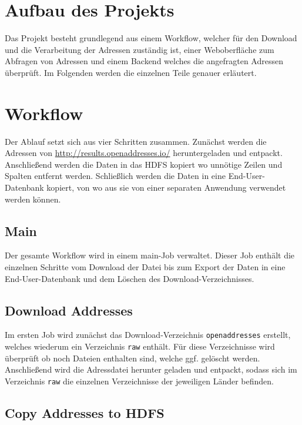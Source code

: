\documentclass[
	a4paper,
	12p,
	bibliography=totocnumbered
]{scrartcl}
\begin{document}
\section{Aufbau des Projekts}

Das Projekt besteht grundlegend aus einem Workflow, welcher für den Download und die Verarbeitung der Adressen zuständig ist, einer Weboberfläche zum Abfragen von Adressen und einem Backend welches die angefragten Adressen überprüft. Im Folgenden werden die einzelnen Teile genauer erläutert.


\section{Workflow}

Der Ablauf setzt sich aus vier Schritten zusammen. Zunächst werden die Adressen von \url{http://results.openaddresses.io/} heruntergeladen und entpackt. Anschließend werden die Daten in das HDFS kopiert wo unnötige Zeilen und Spalten entfernt werden. Schließlich werden die Daten in eine End-User-Datenbank kopiert, von wo aus sie von einer separaten Anwendung verwendet werden können.


\subsection{Main}

Der gesamte Workflow wird in einem main-Job verwaltet. Dieser Job enthält die einzelnen Schritte vom Download der Datei bis zum Export der Daten in eine End-User-Datenbank und dem Löschen des Download-Verzeichnisses. 


\subsection{Download Addresses}

Im ersten Job wird zunächst das Download-Verzeichnis \texttt{openaddresses} erstellt, welches wiederum ein Verzeichnis \texttt{raw} enthält. Für diese Verzeichnisse wird überprüft ob noch Dateien enthalten sind, welche ggf. gelöscht werden. Anschließend wird die Adressdatei herunter geladen und entpackt, sodass sich im Verzeichnis \texttt{raw} die einzelnen Verzeichnisse der jeweiligen Länder befinden.


\subsection{Copy Addresses to HDFS}
\end{document}
